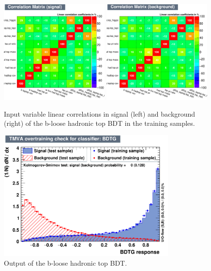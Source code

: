 \begin{figure}[hbtp]
 \begin{center}
   \includegraphics[width=0.49\textwidth]{ch9_figs/recoBdt_bloose/CorrelationMatrixS.pdf}
   \includegraphics[width=0.49\textwidth]{ch9_figs/recoBdt_bloose/CorrelationMatrixB.pdf}
   \caption[Input variable linear correlations of the b-loose hadronic top BDT]{Input variable linear correlations in signal (left) and background (right)
     of the b-loose hadronic top BDT in the training samples.}
   \label{fig:recoBdt_b_loose_corrMatrix}
 \end{center}
\end{figure}

\begin{figure}[hbtp]
 \begin{center}
   \includegraphics[width=0.8\textwidth]{ch9_figs/recoBdt_bloose/overtrain_BDTG.pdf}
   \caption[Output of the b-loose hadronic top BDT]{Output of the b-loose hadronic top BDT.}
   \label{fig:recoBdt_bloose_score}
 \end{center}
\end{figure}


